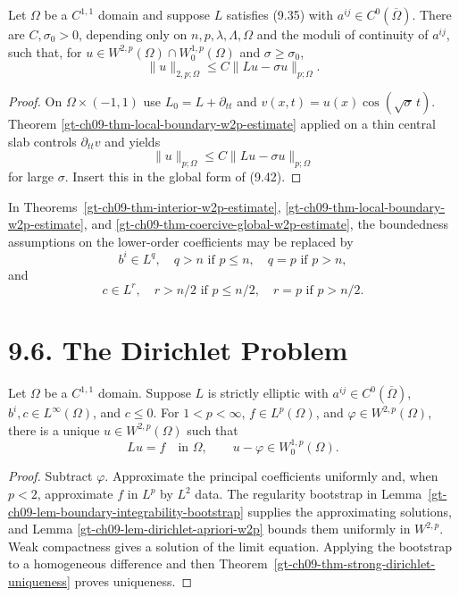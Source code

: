 \begin{theorem}
\label{gt-ch09-thm-coercive-global-w2p-estimate}
Let $\Omega$ be a $C^{1,1}$ domain and suppose $L$ satisfies (9.35) with
$a^{ij}\in C^0(\overline\Omega)$.  There are $C,\sigma_0>0$, depending only
on $n,p,\lambda,\Lambda,\Omega$ and the moduli of continuity of $a^{ij}$,
such that, for $u\in W^{2,p}(\Omega)\cap W^{1,p}_0(\Omega)$ and
$\sigma\ge\sigma_0$,
\begin{equation}\tag{9.43}
\|u\|_{2,p;\Omega}\le C\|Lu-\sigma u\|_{p;\Omega}.
\end{equation}
\end{theorem}
\begin{proof}
\sketch On $\Omega\times(-1,1)$ use
$L_0=L+\partial_{tt}$ and
$v(x,t)=u(x)\cos(\sqrt\sigma\,t)$.  Theorem
\ref{gt-ch09-thm-local-boundary-w2p-estimate} applied on a thin central
slab controls $\partial_{tt}v$ and yields
\[
\|u\|_{p;\Omega}\le C\|Lu-\sigma u\|_{p;\Omega}\tag{9.44}
\]
for large $\sigma$.  Insert this in the global form of (9.42).
\end{proof}

In Theorems~\ref{gt-ch09-thm-interior-w2p-estimate},
\ref{gt-ch09-thm-local-boundary-w2p-estimate}, and
\ref{gt-ch09-thm-coercive-global-w2p-estimate}, the boundedness assumptions
on the lower-order coefficients may be replaced by
\[
b^i\in L^q,\quad
q>n\text{ if }p\le n,\quad q=p\text{ if }p>n,
\]
and
\[
c\in L^r,\quad
r>n/2\text{ if }p\le n/2,\quad r=p\text{ if }p>n/2.
\]

\section*{9.6. The Dirichlet Problem}

\begin{theorem}
\label{gt-ch09-thm-strong-dirichlet-w2p}
Let $\Omega$ be a $C^{1,1}$ domain.  Suppose $L$ is strictly elliptic with
$a^{ij}\in C^0(\overline\Omega)$, $b^i,c\in L^\infty(\Omega)$, and
$c\le0$.  For $1<p<\infty$, $f\in L^p(\Omega)$, and
$\varphi\in W^{2,p}(\Omega)$, there is a unique $u\in W^{2,p}(\Omega)$ such
that
\[
Lu=f\quad\text{in }\Omega,
\qquad u-\varphi\in W^{1,p}_0(\Omega).
\]
\end{theorem}
\begin{proof}
\sketch Subtract $\varphi$.  Approximate the principal coefficients uniformly
and, when $p<2$, approximate $f$ in $L^p$ by $L^2$ data.  The regularity
bootstrap in Lemma~\ref{gt-ch09-lem-boundary-integrability-bootstrap} supplies
the approximating solutions, and Lemma
\ref{gt-ch09-lem-dirichlet-apriori-w2p} bounds them uniformly in $W^{2,p}$.
Weak compactness gives a solution of the limit equation.  Applying the
bootstrap to a homogeneous difference and then
Theorem~\ref{gt-ch09-thm-strong-dirichlet-uniqueness} proves uniqueness.
\end{proof}

